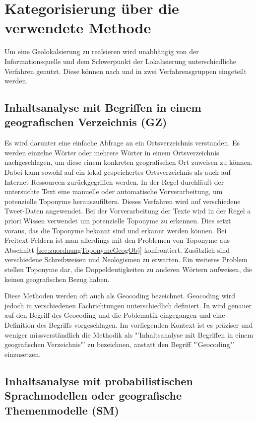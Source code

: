 	\section{Kategorisierung über die verwendete Methode}

		Um eine Geolokalsierung zu realsieren wird unabhängig von der Informationsquelle und dem Schwerpunkt der Lokalisierung unterschiedliche Verfahren genutzt.
		Diese können nach \cite{Schulz2013} und \cite{Cheng2010} in zwei Verfahrensgruppen eingeteilt werden.

		\subsection{Inhaltsanalyse mit Begriffen in einem geografischen Verzeichnis (GZ)}  
	
			Es wird darunter eine einfache Abfrage an ein Ortsverzeichnis verstanden. 
			Es werden einzelne Wörter oder mehrere Wörter in einem Ortsverzeichnis nachgeschlagen, um diese einem konkreten geografischen Ort zuweisen zu können.
			Dabei kann sowohl auf ein lokal gespeichertes Ortsverzeichnis als auch auf Internet Ressourcen zurückgegriffen werden.  
			In der Regel durchläuft der untersuchte Text eine manuelle oder automatische Vorverarbeitung, um potenzielle Toponyme herauszufiltern. 
			Dieses Verfahren wird auf verschiedene Tweet-Daten angewendet.
			Bei der Vorverarbeitung der Texte wird in der Regel a priori Wissen verwendet um potenzielle Toponyme zu erkennen.
			Dies setzt voraus, das die Toponyme bekannt sind und erkannt werden können. 
			Bei Freitext-Feldern ist man allerdings mit den Problemen von Toponyme aus Abschnitt \ref{sec:zuordnungToponymeGeogObj} konfrontiert.
			Zusätzlich sind verschiedene Schreibweisen und Neologismen zu erwarten. 
			Ein weiteres Problem stellen Toponyme dar, die Doppeldeutigkeiten zu anderen Wörtern aufweisen, die keinen geografischen Bezug haben.

			Diese Methoden werden oft auch als Geocoding bezeichnet. 
			Geocoding wird jedoch in verschiedenen Fachrichtungen unterschiedlich definiert. 
			In \cite{bibsmaniaaa:Goldberg2008} wird genauer auf den Begriff des Geocoding und die Poblematik eingegangen und eine Definition  des Begriffs vorgeschlagen.
			Im vorliegenden Kontext ist es präziser und weniger missverständlich die Methodik als "'Inhaltsanalyse mit Begriffen in einem geografischen Verzeichnis"' zu bezeichnen, anstatt den Begriff "'Geocoding"' einzusetzen. 

		\subsection{Inhaltsanalyse mit probabilistischen Sprachmodellen oder geografische Themenmodelle (SM)}

